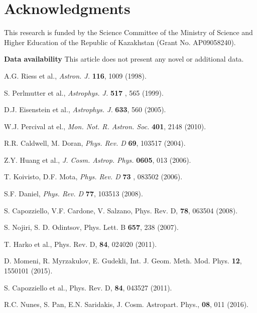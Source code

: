 \documentclass[prd,superscriptaddress,amsfonts,amssymb,amsmath,showpacs,twocolumn]{revtex4-2}
\begin{document}
\section*{Acknowledgments}
This research is funded by the Science Committee of the Ministry of Science and Higher Education of the Republic of Kazakhstan (Grant No. AP09058240).

\textbf{Data availability} This article does not present any novel or additional data.\newline


\begin{thebibliography}{99}

 A.G. Riess et al., \textit{Astron. J.} \textbf{116}, 1009
(1998).

 S. Perlmutter et al., \textit{Astrophys. J.} \textbf{517%
}, 565 (1999).

 D.J. Eisenstein et al., \textit{Astrophys. J.} \textbf{633},
560 (2005).

 W.J. Percival at el., \textit{Mon. Not. R. Astron. Soc.} 
\textbf{401}, 2148 (2010).

 R.R. Caldwell, M. Doran, \textit{Phys. Rev. D} \textbf{69},
103517 (2004).

 Z.Y. Huang et al., \textit{J. Cosm. Astrop. Phys.} \textbf{%
0605}, 013 (2006).

 T. Koivisto, D.F. Mota, \textit{Phys. Rev. D} \textbf{73%
}, 083502 (2006).

 S.F. Daniel, \textit{Phys. Rev. D} \textbf{77}, 103513 (2008).

 S. Capozziello, V.F. Cardone, V. Salzano, Phys. Rev. D, \textbf{78}, 063504 (2008).

 S. Nojiri, S. D. Odintsov, Phys. Lett. B \textbf{657}, 238 (2007).

 T. Harko et al., Phys. Rev. D, \textbf{84}, 024020 (2011).

 D. Momeni, R. Myrzakulov, E. Gudekli, Int. J. Geom. Meth. Mod.
Phys. \textbf{12}, 1550101 (2015).

 S. Capozziello et al., Phys. Rev. D, \textbf{84}, 043527 (2011).

 R.C. Nunes, S. Pan, E.N. Saridakis, J. Cosm. Astropart. Phys., \textbf{08}, 011 (2016). 


\end{thebibliography}
\end{document}
